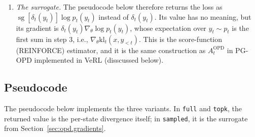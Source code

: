 \begin{enumerate}
    distribution. We record this as
    \begin{align}
        \nabla_\theta\mathrm{kl}_t(x,y_{<t})
        =
        \sum_{v\in\Vcal}p_t(v)\,\delta_t(v)\,\nabla_\theta\log p_t(v).
        \label{eq:opd.full-kl-grad}
    \end{align}
    \item \emph{The surrogate.} The pseudocode below therefore returns the loss as 
    $\operatorname{sg}[\delta_t(y_t)]\log p_t(y_t)$ instead of $\delta_t(y_t)$. Its value
    has no meaning, but its gradient is $\delta_t(y_t)\nabla_\theta\log p_t(y_t)$, whose
    expectation over $y_t\sim p_t$ is the first sum in step 3, i.e.,
    $\nabla_\theta\mathrm{kl}_t(x,y_{<t})$. This is the score-function (REINFORCE)
    estimator, and it is the same construction as $A_t^{\mathrm{OPD}}$ in PG-OPD implemented in VeRL (disscussed below).
\end{enumerate}

\subsection{Pseudocode}

The pseudocode below implements the three variants. In \texttt{full} and \texttt{topk},
the returned value is the per-state divergence itself; in \texttt{sampled}, it is the
surrogate from Section~\ref{sec:opd.gradients}.

